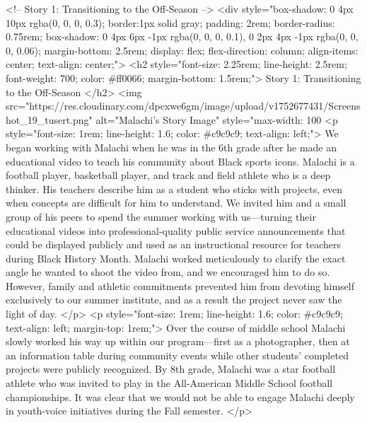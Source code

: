             <!-- Story 1: Transitioning to the Off-Season -->
            <div style="box-shadow: 0 4px 10px rgba(0, 0, 0, 0.3); border:1px solid gray; padding: 2rem; border-radius: 0.75rem; box-shadow: 0 4px 6px -1px rgba(0, 0, 0, 0.1), 0 2px 4px -1px rgba(0, 0, 0, 0.06); margin-bottom: 2.5rem; display: flex; flex-direction: column; align-items: center; text-align: center;">
                <h2 style="font-size: 2.25rem; line-height: 2.5rem; font-weight: 700; color: #ff0066; margin-bottom: 1.5rem;">
                    Story 1: Transitioning to the Off-Season
                </h2>
                <img src="https://res.cloudinary.com/dpcxwe6gm/image/upload/v1752677431/Screenshot_19_tusert.png" alt="Malachi's Story Image" style="max-width: 100%
                <p style="font-size: 1rem; line-height: 1.6; color: #c9c9c9; text-align: left;">
                    We began working with Malachi when he was in the 6th grade after he made an educational video to teach his community about Black sports icons. Malachi is a football player, basketball player, and track and field athlete who is a deep thinker. His teachers describe him as a student who sticks with projects, even when concepts are difficult for him to understand. We invited him and a small group of his peers to spend the summer working with us—turning their educational videos into professional-quality public service announcements that could be displayed publicly and used as an instructional resource for teachers during Black History Month. Malachi worked meticulously to clarify the exact angle he wanted to shoot the video from, and we encouraged him to do so. However, family and athletic commitments prevented him from devoting himself exclusively to our summer institute, and as a result the project never saw the light of day.
                </p>
                <p style="font-size: 1rem; line-height: 1.6; color: #c9c9c9; text-align: left; margin-top: 1rem;">
                    Over the course of middle school Malachi slowly worked his way up within our program—first as a photographer, then at an information table during community events while other students’ completed projects were publicly recognized. By 8th grade, Malachi was a star football athlete who was invited to play in the All-American Middle School football championships. It was clear that we would not be able to engage Malachi deeply in youth-voice initiatives during the Fall semester.
                </p>
